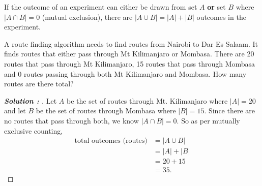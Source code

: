 \documentclass[11pt]{article}
\newenvironment{solution}[1][]{%
  \renewcommand\qedsymbol{$\blacksquare$}%
  \def\temp{\normalfont\bfseries Solution \theexample: #1}
  \begin{proof}[\temp]
  \normalfont %
}{%
  \end{proof}
}
\newcommand{\BF}{\textbf}
\begin{document}
\begin{definition}
    \label{sec:Mutually-Exclusive-Counting}
    If the outcome of an experiment can either be drawn from set $A$ \BF{or} set $B$ where $|A\cap B| = 0$ (mutual exclusion), there are
    $|A\cup B|=|A|+|B|$ outcomes in the experiment.
\end{definition}
\begin{example}
    A route finding algorithm needs to find routes from Nairobi to Dar Es Salaam. It finds routes that either pass through Mt Kilimanjaro or
    Mombasa. There are 20 routes that pass through Mt Kilimanjaro, 15 routes that pass through Mombasa and 0 routes passing through both Mt
    Kilimanjaro and Mombasa. How many routes are there total?
\end{example}
\begin{solution}
    Let $A$ be the set of routes through Mt. Kilimanjaro where $|A|=20$ and let $B$ be the set of routes through Mombasa where $|B|=15$.
    Since there are no routes that pass through both, we know $|A \cap B| = 0$. So as per mutually exclusive counting,
    \begin{align*}
        \text{total outcomes (routes)} &= |A \cup B|\\
                                       &= |A|+|B|\\
                                       &= 20+15\\
                                       &= 35.
    \end{align*} 
\end{solution}
\end{document}
